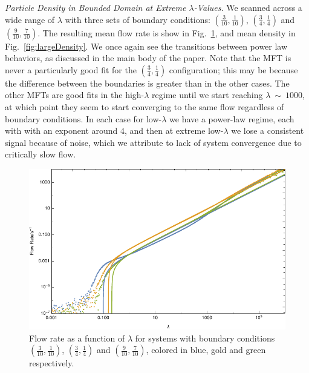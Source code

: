 \documentclass[
reprint,
 amsmath,amssymb,
 aps,
 prl,
]{revtex4-1}
\begin{document}
\textit{Particle Density in Bounded Domain at Extreme $\lambda$-Values.}
We scanned across a wide range of $\lambda$ with three sets of boundary conditions: $(\frac{3}{10}, \frac{1}{10})$, $(\frac{3}{4}, \frac{1}{4})$ and $(\frac{9}{10}, \frac{7}{10})$. The resulting mean flow rate is show in
Fig.~\ref{fig:largeFlow}, and mean density in Fig.~\ref{fig:largeDensity}. We once again see the transitions between power law behaviors, as discussed in the main body of the paper. Note that the MFT is never a particularly good
fit for the $(\frac{3}{4}, \frac{1}{4})$ configuration; this may be because the difference between the boundaries is greater than in the other cases. The other MFTs are good fits in the high-$\lambda$ regime until we start reaching $\lambda~\sim~1000$,
at which point they seem to start converging to the same flow regardless of boundary conditions. In each case for low-$\lambda$ we have a power-law regime, each with with an exponent around $4$, and then at extreme low-$\lambda$ we lose
a consistent signal because of noise, which we attribute to lack of system convergence due to critically slow flow.
\begin{figure}[h!]
\vspace{1em}
\caption{\label{fig:largeFlow} Flow rate as a function of $\lambda$ for systems with boundary conditions $(\frac{3}{10}, \frac{1}{10})$, $(\frac{3}{4}, \frac{1}{4})$ and $(\frac{9}{10}, \frac{7}{10})$, colored in blue, gold and green
respectively.}
    \includegraphics[width=0.95\linewidth]{largeRangeFlow}
    \vspace{0em}
\end{figure}
\end{document}
